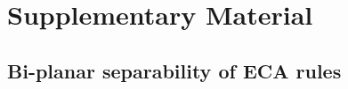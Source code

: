 \appendix
\section{Supplementary Material}
\subsection*{Bi-planar separability of ECA rules}
\label{sec:Bi-planar separability of ECA rules}